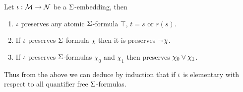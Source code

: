 \begin{prop}
    Let $\iota : \mathcal{M} \to \mathcal{N}$ be a $\Sigma$-embedding, then
    \begin{enumerate}
        \item $\iota$ preserves any atomic $\Sigma$-formula 
            $\top$, $t = s$ or $r(s)$.
        \item If $\iota$ preserves $\Sigma$-formula $\chi$ then it is 
            preserves $\neg\, \chi$.
        \item If $\iota$ preserves $\Sigma$-formulas $\chi_0$ and $\chi_1$ 
            then preserves $\chi_0 \lor \chi_1$.
    \end{enumerate}
    Thus from the above we can deduce by induction
    that if $\iota$ is elementary with respect to all 
    quantifier free $\Sigma$-formulas.
\end{prop}
